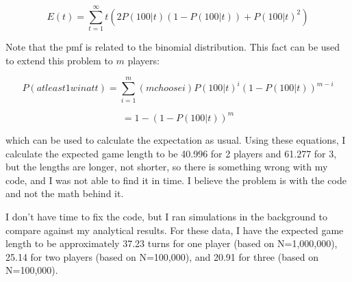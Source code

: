 \documentclass{article}
\begin{document}
\begin{equation}
E(t) = \sum_{t=1}^{\infty}{t(2P(100|t)(1-P(100|t))+P(100|t)^2)}
\end{equation}

\noindent Note that the pmf is related to the binomial
distribution. This fact can be used to extend this problem to $m$
players:

\begin{equation}
P(at least 1 win at t) = \sum_{i=1}^{m}{(m choose i)P(100|t)^i(1-P(100|t))^{m-i}}
\end{equation}

\begin{equation}
= 1 - (1-P(100|t))^m
\end{equation}

\noindent which can be used to calculate the expectation as
usual. Using these equations, I calculate the expected game length to
be 40.996 for 2 players and 61.277 for 3, but the lengths are longer,
not shorter, so there is something wrong with my code, and I was not
able to find it in time. I believe the problem is with the code and
not the math behind it.

I don't have time to fix the code, but I ran simulations in the
background to compare against my analytical results. For these data, I
have the expected game length to be approximately 37.23 turns for one
player (based on N=1,000,000), 25.14 for two players (based on
N=100,000), and 20.91 for three (based on N=100,000).

\begin{equation}
\end{equation}
\end{document}
